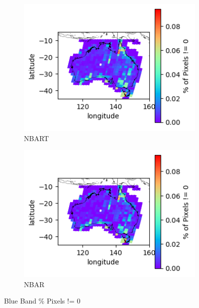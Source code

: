 \documentclass[a4paper]{article}
\begin{document}
      \begin{figure}[h!]
        \centering
          \begin{subfigure}[l]{.4\linewidth}
            \hspace{-32mm}
            \includegraphics[scale=0.9]{plots/nbart/nbart_blue-PercentDifferent.png}
            \caption{NBART}
          \end{subfigure}
%
          \begin{subfigure}[r]{.4\linewidth}
            \includegraphics[scale=0.9]{plots/nbar/nbar_blue-PercentDifferent.png}
            \caption{NBAR}
          \end{subfigure}
        \caption{Blue Band \% Pixels != 0}\label{figure:16}
      \end{figure}

  \clearpage
\end{document}
